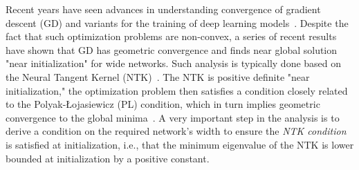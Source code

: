 
Recent  years have seen advances in understanding convergence of gradient descent (GD) and variants for the training of deep learning models~\citep{SD-JL-HL-LW-XZ:19,ZAZ-YL-ZS:19,DZ-QG:19,DZ-YC-DZ-QG:20,CL-LZ-MB:21,ZJ-MT:19,oymak2020hermite,ng2021opt}. Despite the fact that such optimization problems are non-convex, a series of recent results have shown that GD has geometric convergence and finds near global solution "near initialization" for wide networks. Such analysis is typically done based on the Neural Tangent Kernel (NTK)~\citep{AJ-FG-CH:18}. The NTK is positive definite "near initialization," the optimization problem then satisfies a condition closely related to the Polyak-Łojasiewicz (PL) condition, which in turn implies geometric convergence to the global minima~\citep{CL-LZ-MB:21,ng2021opt}. A very important step in the analysis is to derive a condition 
on the required network's width to ensure the \emph{NTK condition} is satisfied at initialization, i.e., that the minimum eigenvalue of the NTK is lower bounded at initialization by a positive constant.

